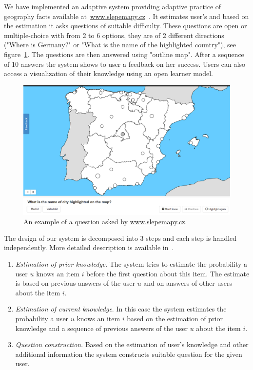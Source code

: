 \documentclass[table,color,cover,twoside,nolot,nolof]{fithesis3/fithesis3}
\begin{document}
We have implemented an adaptive system providing adaptive practice of geography
facts available at~\url{www.slepemapy.cz}~\cite{papousek2014adaptive}. It
estimates user's and based on the estimation it asks questions of suitable
difficulty. These questions are open or multiple-choice with from 2 to 6
options, they are of 2 different directions ("Where is Germany?" or "What is
the name of the highlighted country"), see
figure~\ref{figure:example_question}. The questions are then answered using
"outline map". After a sequence of 10 answers the system shows to user a
feedback on her success.  Users can also access a visualization of their
knowledge using an open learner model.

\begin{figure}[h]
	\begin{center}
		\includegraphics[width=\textwidth]{figure/slepemapy_spain_highlighted}
		\caption{An example of a question asked by \url{www.slepemapy.cz}.}
		\label{figure:example_question}
	\end{center}
\end{figure}

The design of our system is decomposed into 3 steps and each step is handled
independently. More detailed description is available
in~\cite{papousek2014adaptive, papousek2015impact}.

\begin{enumerate}
	\item \emph{Estimation of prior knowledge}. The system tries to estimate the
		probability a user $u$ knows an item $i$ before the first question
		about this item. The estimate is based on previous answers of the user $u$
		and on answers of other users about the item $i$.
	\item \emph{Estimation of current knowledge}. In this case the system
		estimates the probability a user $u$ knows an item $i$ based on the
		estimation of prior knowledge and a sequence of previous answers of the
		user $u$ about the item $i$.
	\item \emph{Question construction}. Based on the estimation of user's
		knowledge and other additional information the system constructs suitable
		question for the given user.
\end{enumerate}
\end{document}
